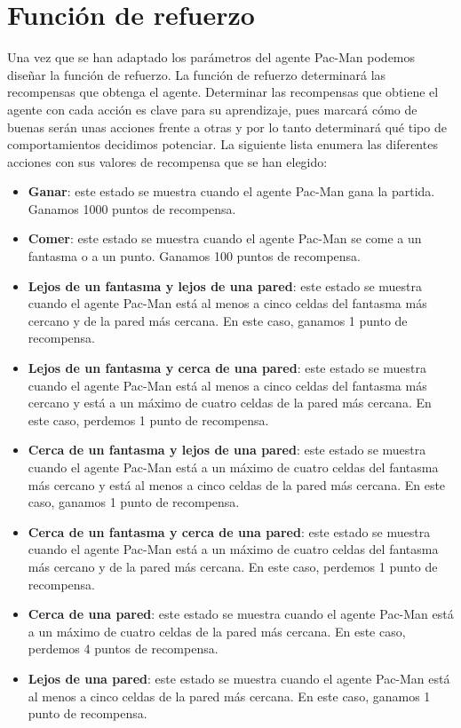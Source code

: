 \documentclass[11pt]{exam}
\begin{document}
\section{Función de refuerzo}\label{refuerzo}

Una vez que se han adaptado los parámetros del agente Pac-Man podemos diseñar la función de refuerzo. La función de refuerzo determinará las recompensas que obtenga el agente. Determinar las recompensas que obtiene el agente con cada acción es clave para su aprendizaje, pues marcará cómo de buenas serán unas acciones frente a otras y por lo tanto determinará qué tipo de comportamientos decidimos potenciar. La siguiente lista enumera las diferentes acciones con sus valores de recompensa que se han elegido:

\begin{itemize}
	\item \textbf{Ganar}: este estado se muestra cuando el agente Pac-Man gana la partida. Ganamos 1000 puntos de recompensa.
	
	\item \textbf{Comer}: este estado se muestra cuando el agente Pac-Man se come a un fantasma o a un punto. Ganamos 100 puntos de recompensa.
	
	\item \textbf{Lejos de un fantasma y lejos de una pared}: este estado se muestra cuando el agente Pac-Man está al menos a cinco celdas del fantasma más cercano y de la pared más cercana. En este caso, ganamos 1 punto de recompensa.
	
	\item \textbf{Lejos de un fantasma y cerca de una pared}: este estado se muestra cuando el agente Pac-Man está al menos a cinco celdas del fantasma más cercano y está a un máximo de cuatro celdas de la pared más cercana. En este caso, perdemos 1 punto de recompensa.
	
	\item \textbf{Cerca de un fantasma y lejos de una pared}: este estado se muestra cuando el agente Pac-Man está a un máximo de cuatro celdas del fantasma más cercano y está al menos a cinco celdas de la pared más cercana.  En este caso, ganamos 1 punto de recompensa.
	
	\item \textbf{Cerca de un fantasma y cerca de una pared}: este estado se muestra cuando el agente Pac-Man está a un máximo de cuatro celdas del fantasma más cercano y de la pared más cercana. En este caso, perdemos 1 punto de recompensa.
	
	\item \textbf{Cerca de una pared}: este estado se muestra cuando el agente Pac-Man está a un máximo de cuatro celdas de la pared más cercana. En este caso, perdemos 4 puntos de recompensa.
	
	\item \textbf{Lejos de una pared}: este estado se muestra cuando el agente Pac-Man está al menos a cinco celdas de la pared más cercana. En este caso, ganamos 1 punto de recompensa.
\end{itemize}
\end{document}
